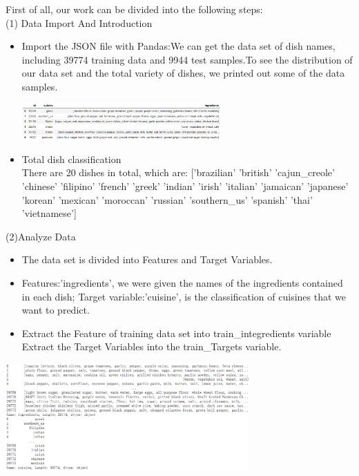 First of all, our work can be divided into the following steps:\\
(1)   Data Import And Introduction
\begin{itemize}
  \item Import the JSON file with Pandas:We can get the data set of dish names, including 39774 training data and 9944 test samples.To see the distribution of our data set and the total variety of dishes, we printed out some of the data samples.
  \begin{center}
    \begin{minipage}{1\linewidth}
     \centering
      \includegraphics[width=0.6\textwidth]{pic01/a .eps}
    \end{minipage}
  
    \hfill
  \end{center}
  \item Total dish classification\\
        There are 20 dishes in total, which are:
        ['brazilian' 'british' 'cajun_creole' 'chinese' 'filipino' 'french'
         'greek' 'indian' 'irish' 'italian' 'jamaican' 'japanese' 'korean'
         'mexican' 'moroccan' 'russian' 'southern_us' 'spanish' 'thai'
         'vietnamese']
\end{itemize} 
(2)Analyze Data
\begin{itemize}
 \item The data set is divided into Features and Target Variables.
 \item Features:'ingredients', we were given the names of the ingredients contained in each dish;
Target variable:'cuisine', is the classification of cuisines that we want to predict.
 \item Extract the Feature of training data set into train_integredients variable
      Extract the Target Variables into the train_Targets variable.
\end{itemize} 
\begin{center}
  \begin{minipage}{1\linewidth}
  \centering
  \includegraphics[width=0.7\textwidth]{pic01/b.eps}
\end{minipage}

  \hfill
\end{center}
